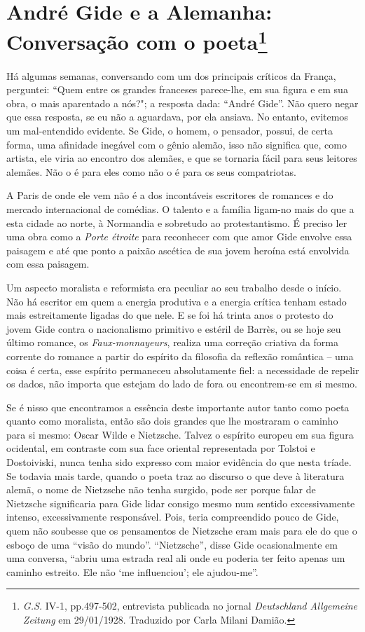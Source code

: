 \chapter{André Gide e a Alemanha:\\
Conversação com o poeta\footnote[*]{\emph{G.S.} IV-1,
  pp.497-502, entrevista publicada no jornal \emph{Deutschland
  Allgemeine Zeitung} em 29/01/1928. Traduzido por Carla Milani Damião.}}

Há algumas semanas, conversando com um dos principais críticos da
França, perguntei: ``Quem entre os grandes franceses parece-lhe, em sua
figura e em sua obra, o mais aparentado a nós?"; a resposta dada:
``André Gide''. Não quero negar que essa resposta, se eu não a
aguardava, por ela ansiava. No entanto, evitemos um mal-entendido
evidente. Se Gide, o homem, o pensador, possui, de certa forma, uma
afinidade inegável com o gênio alemão, isso não significa que, como
artista, ele viria ao encontro dos alemães, e que se tornaria fácil para
seus leitores alemães. Não o é para eles como não o é para os seus
compatriotas.

A Paris de onde ele vem não é a dos incontáveis ​​escritores de romances
e do mercado internacional de comédias. O talento e a família ligam-no
mais do que a esta cidade ao norte, à Normandia e sobretudo ao
protestantismo. É preciso ler uma obra como a \emph{Porte étroite} para
reconhecer com que amor Gide envolve essa paisagem e até que ponto a
paixão ascética de sua jovem heroína está envolvida com essa paisagem.

Um aspecto moralista e reformista era peculiar ao seu trabalho desde o
início. Não há escritor em quem a energia produtiva e a energia crítica
tenham estado mais estreitamente ligadas do que nele. E se foi há trinta
anos o protesto do jovem Gide contra o nacionalismo primitivo e estéril
de Barrès, ou se hoje seu último romance, os \emph{Faux-monnayeurs},
realiza uma correção criativa da forma corrente do romance a partir do
espírito da filosofia da reflexão romântica -- uma coisa é certa, esse
espírito permaneceu absolutamente fiel: a necessidade de repelir os
dados, não importa que estejam do lado de fora ou encontrem-se em si
mesmo.

Se é nisso que encontramos a essência deste importante autor tanto como
poeta quanto como moralista, então são dois grandes que lhe mostraram o
caminho para si mesmo: Oscar Wilde e Nietzsche. Talvez o espírito
europeu em sua figura ocidental, em contraste com sua face oriental
representada por Tolstoi e Dostoiviski, nunca tenha sido expresso com
maior evidência do que nesta tríade. Se todavia mais tarde, quando o
poeta traz ao discurso o que deve à literatura alemã, o nome de
Nietzsche não tenha surgido, pode ser porque falar de Nietzsche
significaria para Gide lidar consigo mesmo num sentido excessivamente
intenso, excessivamente responsável. Pois, teria compreendido pouco de
Gide, quem não soubesse que os pensamentos de Nietzsche eram mais para
ele do que o esboço de uma ``visão do mundo''. ``Nietzsche'', disse Gide
ocasionalmente em uma conversa, ``abriu uma estrada real ali onde eu
poderia ter feito apenas um caminho estreito. Ele não `me influenciou';
ele ajudou-me''.

